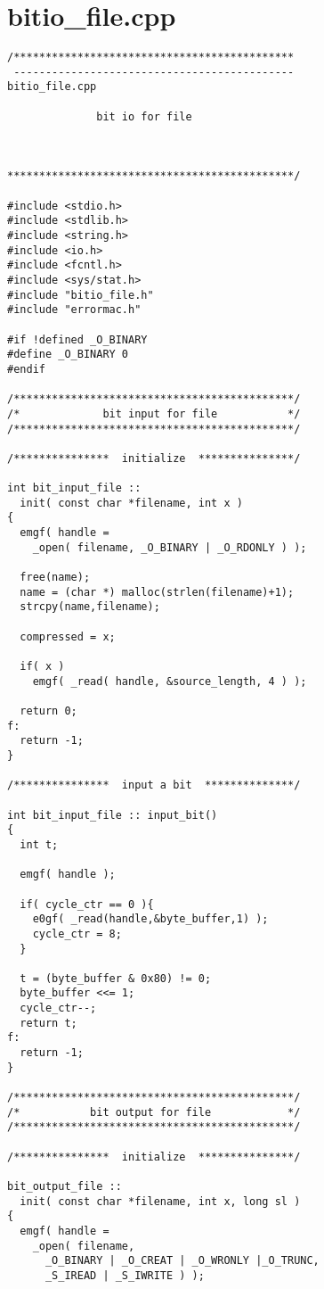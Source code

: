 \section{bitio\_file.cpp}
\begin{verbatim}
/********************************************
 --------------------------------------------
bitio_file.cpp

              bit io for file



*********************************************/

#include <stdio.h>
#include <stdlib.h>
#include <string.h>
#include <io.h>
#include <fcntl.h>
#include <sys/stat.h>
#include "bitio_file.h"
#include "errormac.h"

#if !defined _O_BINARY
#define _O_BINARY 0
#endif

/********************************************/
/*             bit input for file           */
/********************************************/

/***************  initialize  ***************/

int bit_input_file ::
  init( const char *filename, int x )
{
  emgf( handle =
    _open( filename, _O_BINARY | _O_RDONLY ) );

  free(name);
  name = (char *) malloc(strlen(filename)+1);
  strcpy(name,filename);

  compressed = x;

  if( x )
    emgf( _read( handle, &source_length, 4 ) );

  return 0;
f:
  return -1;
}

/***************  input a bit  **************/

int bit_input_file :: input_bit()
{
  int t;

  emgf( handle );

  if( cycle_ctr == 0 ){
    e0gf( _read(handle,&byte_buffer,1) );
    cycle_ctr = 8;
  }

  t = (byte_buffer & 0x80) != 0;
  byte_buffer <<= 1;
  cycle_ctr--;
  return t;
f:
  return -1;
}

/********************************************/
/*           bit output for file            */
/********************************************/

/***************  initialize  ***************/

bit_output_file ::
  init( const char *filename, int x, long sl )
{
  emgf( handle =
    _open( filename,
      _O_BINARY | _O_CREAT | _O_WRONLY |_O_TRUNC,
      _S_IREAD | _S_IWRITE ) );


\end{verbatim}
